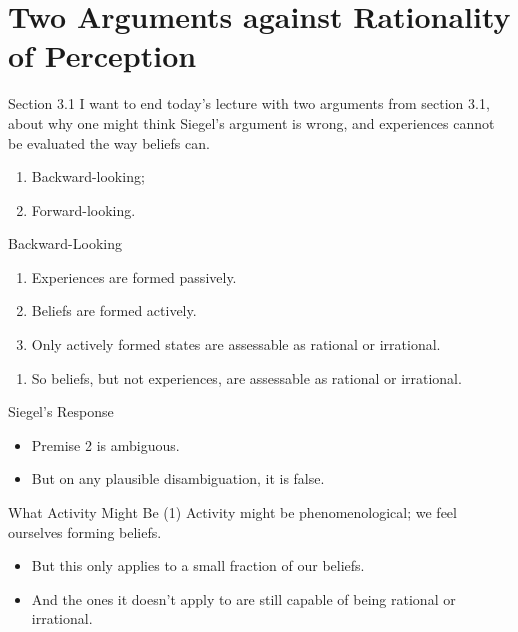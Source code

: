 \documentclass[
  17pt,
  letterpaper,
  ignorenonframetext,
  aspectratio=169,
  xcolor={dvipsnames}]{beamer}
\providecommand{\tightlist}{%
  \setlength{\itemsep}{0pt}\setlength{\parskip}{0pt}}\usepackage{longtable,booktabs,array}
\begin{document}
\hypertarget{two-arguments-against-rationality-of-perception}{%
\section{Two Arguments against Rationality of
Perception}\label{two-arguments-against-rationality-of-perception}}

\begin{frame}{Section 3.1}
\protect\hypertarget{section-3.1}{}
I want to end today's lecture with two arguments from section 3.1, about
why one might think Siegel's argument is wrong, and experiences cannot
be evaluated the way beliefs can.

\begin{enumerate}[<+->]
\tightlist
\item
  Backward-looking;
\item
  Forward-looking.
\end{enumerate}
\end{frame}

\begin{frame}{Backward-Looking}
\protect\hypertarget{backward-looking}{}
\begin{enumerate}[<+->]
\tightlist
\item
  Experiences are formed passively.
\item
  Beliefs are formed actively.
\item
  Only actively formed states are assessable as rational or irrational.
\end{enumerate}

\begin{enumerate}[<+->]
[A.]
\setcounter{enumi}{2}
\tightlist
\item
  So beliefs, but not experiences, are assessable as rational or
  irrational.
\end{enumerate}
\end{frame}

\begin{frame}{Siegel's Response}
\protect\hypertarget{siegels-response}{}
\begin{itemize}[<+->]
\tightlist
\item
  Premise 2 is ambiguous.
\item
  But on any plausible disambiguation, it is false.
\end{itemize}
\end{frame}

\begin{frame}{What Activity Might Be (1)}
\protect\hypertarget{what-activity-might-be-1}{}
Activity might be phenomenological; we feel ourselves forming beliefs.

\begin{itemize}[<+->]
\tightlist
\item
  But this only applies to a small fraction of our beliefs.
\item
  And the ones it doesn't apply to are still capable of being rational
  or irrational.
\end{itemize}
\end{frame}
\end{document}
